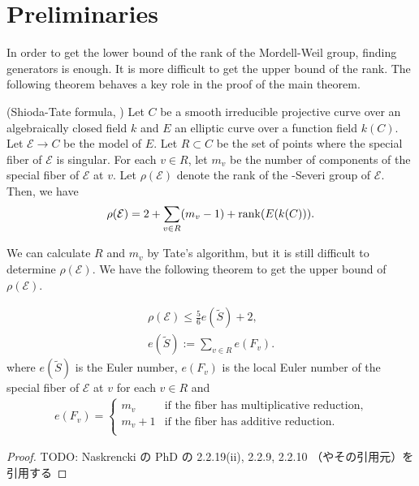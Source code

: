 \documentclass[main]{subfiles}
\begin{document}
\chapter{Preliminaries}

In order to get the lower bound of the rank of the Mordell-Weil group, finding generators is enough.
It is more difficult to get the upper bound of the rank.
The following theorem behaves a key role in the proof of the main theorem.
\begin{thm}{(Shioda-Tate formula, \cite[Corollary 5.3]{ref:shioda1990})}
    \label{thm:shioda}
    Let $C$ be a smooth irreducible projective curve over an algebraically closed field $k$ and $E$ an elliptic curve over a function field $k(C)$.
    Let $\mathcal{E} \to C$ be the \Neron{} model of $E$.
    Let $R \subset C$ be the set of points where the special fiber of $\mathcal{E}$ is singular.
    For each $v \in R$, let $m_{v}$ be the number of components of the special fiber of $\mathcal{E}$ at $v$.
    Let $\rho(\mathcal{E})$ denote the rank of the \Neron-Severi group of $\mathcal{E}$.
    Then, we have
    \begin{equation}
        \rho (\mathcal{E}) = 2 + \sum_{v \in R} (m_{v} - 1) + \operatorname{rank}(E(k(C))).
    \end{equation}
\end{thm}

We can calculate $R$ and $m_{v}$ by Tate's algorithm, but it is still difficult to determine $\rho(\mathcal{E})$.
We have the following theorem to get the upper bound of $\rho(\mathcal{E})$.

\begin{thm}
    \label{thm:rho}
    \begin{align}
        \rho(\mathcal{E}) \leq \frac{5}{6} e(\tilde{S}) + 2, \\
        e(\tilde{S}) := \sum_{v \in R} e(F_{v}).
    \end{align}
    where $e(\tilde{S})$ is the Euler number, $e(F_{v})$ is the local Euler number of the special fiber of $\mathcal{E}$ at $v$ for each $v \in R$ and
    \begin{align}
        e(F_{v}) = \begin{cases}
                       m_v     & \text{if the fiber has multiplicative reduction}, \\
                       m_v + 1 & \text{if the fiber has additive reduction}.       \\
                   \end{cases}
    \end{align}
\end{thm}
\begin{proof}
    TODO: Naskrencki の PhD の 2.2.19(ii), 2.2.9, 2.2.10 （やその引用元）を引用する
\end{proof}
\end{document}
